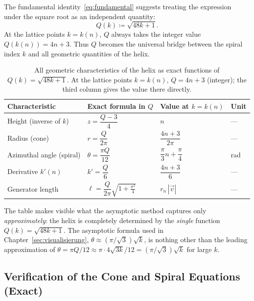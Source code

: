 The fundamental identity~\eqref{eq:fundamental} suggests treating
the expression under the square root as an independent quantity:
\begin{equation}\label{eq:Q_def}
  Q(k) \coloneqq \sqrt{48k + 1}.
\end{equation}
At the lattice points $k = k(n)$, $Q$ always takes the integer
value $Q(k(n)) = 4n+3$. Thus $Q$ becomes the universal
bridge between the spiral index $k$ and all geometric quantities of the helix.

\begin{table}[H]
\centering
\renewcommand{\arraystretch}{1.45}
\caption{All geometric characteristics of the helix as exact functions
  of $Q(k) = \sqrt{48k+1}$. At the lattice points $k = k(n)$,
  $Q = 4n+3$ (integer); the third column gives the
  value there directly.}
\begin{tabular}{llll}
\toprule
Characteristic & Exact formula in $Q$ & Value at $k=k(n)$ & Unit \\
\midrule
Height (inverse of $k$)    & $z = \dfrac{Q-3}{4}$
    & $n$
    & --- \\[8pt]
Radius (cone)              & $r = \dfrac{Q}{2\pi}$
    & $\dfrac{4n+3}{2\pi}$
    & --- \\[8pt]
Azimuthal angle (spiral)   & $\theta = \dfrac{\pi Q}{12}$
    & $\dfrac{\pi}{3}n+\dfrac{\pi}{4}$
    & rad \\[8pt]
Derivative $k'(n)$         & $k' = \dfrac{Q}{6}$
    & $\dfrac{4n+3}{6}$
    & --- \\[8pt]
Generator length           & $\ell = \dfrac{Q}{2\pi}\sqrt{1+\tfrac{\pi^2}{4}}$
    & $r_n\,|\vec{v}|$
    & --- \\[8pt]
\bottomrule
\end{tabular}
\label{tab:Q_uebersicht}
\end{table}

\noindent
The table makes visible what the asymptotic method captures only
\emph{approximately}: the helix is completely determined by the
\emph{single} function $Q(k) = \sqrt{48k+1}$. The
asymptotic formula used in Chapter~\ref{sec:visualisierung},
$\theta \approx (\pi/\sqrt{3})\sqrt{k}$, is nothing other than
the leading approximation of $\theta = \pi Q / 12 \approx \pi \cdot 4\sqrt{3k}/12
= (\pi/\sqrt{3})\sqrt{k}$ for large $k$.

\subsection{Verification of the Cone and Spiral Equations (Exact)}
\label{subsec:verifikation}

